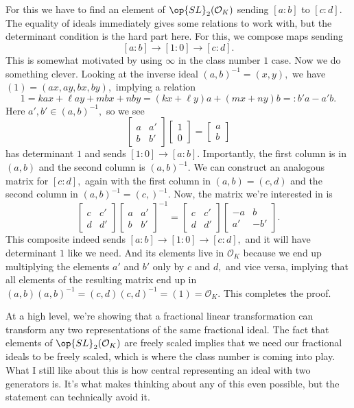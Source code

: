 For this we have to find an element of $\op{SL}_2(\mathcal O_K)$ sending $[a:b]$ to $[c:d].$ The equality of ideals immediately gives some relations to work with, but the determinant condition is the hard part here. For this, we compose maps sending
\[[a:b]\to[1:0]\to[c:d].\]
This is somewhat motivated by using $\infty$ in the class number $1$ case. Now we do something clever. Looking at the inverse ideal $(a,b)^{-1}=(x,y),$ we have $(1)=(ax,ay,bx,by),$ implying a relation
\[1=kax+\ell ay+mbx+nby=(kx+\ell y)a+(mx+ny)b=:b'a-a'b.\]
Here $a',b'\in(a,b)^{-1},$ so we see
\[\begin{bmatrix}
    a & a' \\
    b & b'
\end{bmatrix}\begin{bmatrix}1 \\ 0\end{bmatrix} = \begin{bmatrix}a \\ b\end{bmatrix}\]
has determinant $1$ and sends $[1:0]\to[a:b].$ Importantly, the first column is in $(a,b)$ and the second column is $(a,b)^{-1}.$ We can construct an analogous matrix for $[c:d],$ again with the first column in $(a,b)=(c,d)$ and the second column in $(a,b)^{-1}=(c,)^{-1}.$ Now, the matrix we're interested in is
\[\begin{bmatrix}
    c & c' \\
    d & d'
\end{bmatrix}\begin{bmatrix}
    a & a' \\
    b & b'
\end{bmatrix}^{-1}=\begin{bmatrix}
    c & c' \\
    d & d'
\end{bmatrix}\begin{bmatrix}
    -a & b \\
    a' & -b'
\end{bmatrix}.\]
This composite indeed sends $[a:b]\to[1:0]\to[c:d],$ and it will have determinant $1$ like we need. And its elements live in $\mathcal O_K$ because we end up multiplying the elements $a'$ and $b'$ only by $c$ and $d,$ and vice versa, implying that all elements of the resulting matrix end up in $(a,b)(a,b)^{-1}=(c,d)(c,d)^{-1}=(1)=\mathcal O_K.$ This completes the proof.

At a high level, we're showing that a fractional linear transformation can transform any two representations of the same fractional ideal. The fact that elements of $\op{SL}_2(\mathcal O_K)$ are freely scaled implies that we need our fractional ideals to be freely scaled, which is where the class number is coming into play. What I still like about this is how central representing an ideal with two generators is. It's what makes thinking about any of this even possible, but the statement can technically avoid it.


